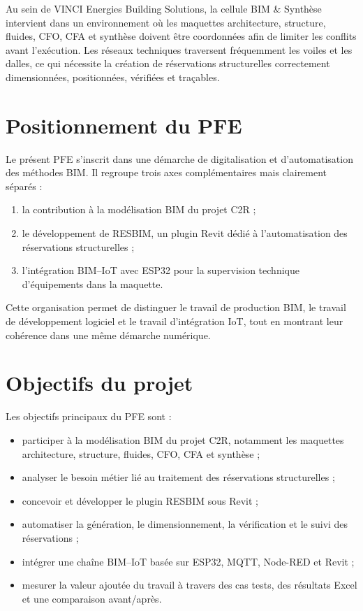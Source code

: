 \documentclass[12pt,a4paper]{report}
\begin{document}
Au sein de VINCI Energies Building Solutions, la cellule BIM \& Synthèse intervient dans un environnement où les maquettes architecture, structure, fluides, CFO, CFA et synthèse doivent être coordonnées afin de limiter les conflits avant l'exécution. Les réseaux techniques traversent fréquemment les voiles et les dalles, ce qui nécessite la création de réservations structurelles correctement dimensionnées, positionnées, vérifiées et traçables.

\section*{Positionnement du PFE}
Le présent PFE s'inscrit dans une démarche de digitalisation et d'automatisation des méthodes BIM. Il regroupe trois axes complémentaires mais clairement séparés :
\begin{enumerate}[leftmargin=1.2cm]
    \item la contribution à la modélisation BIM du projet C2R ;
    \item le développement de RESBIM, un plugin Revit dédié à l'automatisation des réservations structurelles ;
    \item l'intégration BIM--IoT avec ESP32 pour la supervision technique d'équipements dans la maquette.
\end{enumerate}

Cette organisation permet de distinguer le travail de production BIM, le travail de développement logiciel et le travail d'intégration IoT, tout en montrant leur cohérence dans une même démarche numérique.

\section*{Objectifs du projet}
Les objectifs principaux du PFE sont :
\begin{itemize}[leftmargin=1.2cm]
    \item participer à la modélisation BIM du projet C2R, notamment les maquettes architecture, structure, fluides, CFO, CFA et synthèse ;
    \item analyser le besoin métier lié au traitement des réservations structurelles ;
    \item concevoir et développer le plugin RESBIM sous Revit ;
    \item automatiser la génération, le dimensionnement, la vérification et le suivi des réservations ;
    \item intégrer une chaîne BIM--IoT basée sur ESP32, MQTT, Node-RED et Revit ;
    \item mesurer la valeur ajoutée du travail à travers des cas tests, des résultats Excel et une comparaison avant/après.
\end{itemize}
\end{document}
